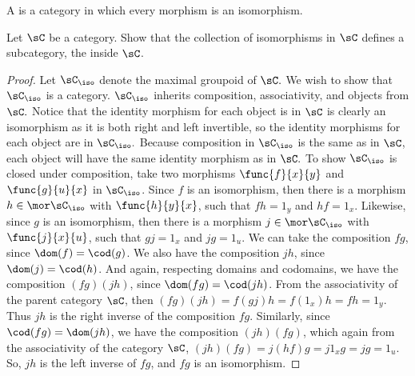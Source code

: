 \documentclass[main.tex]{subfiles}
\begin{document}
\begin{definition}
	A  is a category in which every morphism is an isomorphism.
\end{definition}
\popthm

\begin{exercise}
	Let \(\sC\) be a category. Show that the collection of isomorphisms in
	\(\sC\) defines a subcategory, the  inside \(\sC\).
\end{exercise}

\begin{proof}
	Let $ \sC_{\iso} $ denote the maximal groupoid of $ \sC. $ We wish to show that 
	$ \sC_{\iso} $ is a category. $ \sC_{\iso} $ inherits composition, associativity, and 
	objects from $ \sC. $ Notice that the identity morphism for each object
	 is in $ \sC $ is clearly an isomorphism as it is both right and left 
	 invertible, so the identity morphisms for each object are in $ \sC_{\iso}. $
	Because composition in $ \sC_{\iso} $ is the same as in $ \sC $, each object
	will have the same identity morphism as in $ \sC. $
	To show $ \sC_{\iso} $ is closed under composition, take two morphisms \(\func{f}{x}{y}\) and \(\func{g}{u}{x}\)
	in \(\sC_{\iso}\). Since \(f\) is an isomorphism, then there is a morphism
	\(h\in\mor\sC_{\iso}\) with \(\func{h}{y}{x}\), such that \(fh=1_y\) and
	\(hf=1_x\). Likewise, since \(g\) is an isomorphism, then there is a
	morphism \(j\in\mor\sC_{\iso}\) with \(\func{j}{x}{u}\), such that \(gj=1_x\)
	and \(jg=1_u\). We can take the composition \(fg\), since
	\(\dom(f)=\cod(g)\). We also have the composition \(jh\), since
	\(\dom(j)=\cod(h)\). And again, respecting domains and codomains, we have
	the composition \((fg)(jh)\), since \(\dom(fg)=\cod(jh)\). From the
	associativity of the parent category \(\sC\), then
	\((fg)(jh)=f(gj)h=f(1_x)h=fh=1_y\). Thus \(jh\) is the right inverse of the
	composition \(fg\). Similarly, since \(\cod(fg)=\dom(jh)\), we have the
	composition \((jh)(fg)\), which again from the associativity of the category
	\(\sC\), \((jh)(fg)=j(hf)g=j1_xg=jg=1_u\). So, \(jh\) is the left inverse of
	\(fg\), and \(fg\) is an isomorphism.


\end{proof}
\end{document}
